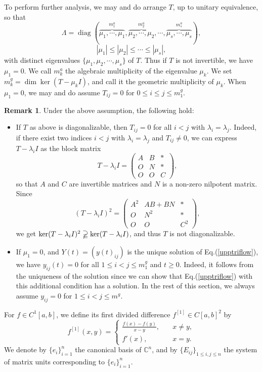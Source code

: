 \documentclass[12pt]{article}
\theoremstyle{definition}
\newtheorem{remark}[theorem]{Remark}
\numberwithin{equation}{section}
\newcommand{\C}{\mathbb{C}}
\DeclareMathOperator{\diag}{diag}
\begin{document}
To perform further analysis, we may and do arrange $T$, up to unitary equivalence, so that 
\[\Lambda=\diag(\overbrace{\mu_1,\cdots,\mu_1}^{m^a_1},\overbrace{\mu_2,\cdots,\mu_2}^{m^a_2},\cdots, 
\overbrace{\mu_s,\cdots,\mu_s}^{m^a_s}),\]
\[|\mu_1|\leq |\mu_2|\leq \cdots\leq |\mu_s|,\]
with distinct eigenvalues $\{\mu_1,\mu_2,\cdots,\mu_s\}$ of $T$. 
Thus if $T$ is not invertible, we have $\mu_1=0$. 
We call $m^a_k$ the algebraic multiplicity of the eigenvalue $\mu_k$. 
We set $m^g_k=\dim \ker(T-\mu_k I)$, and call it the geometric multiplicity of $\mu_k$. 
When $\mu_1=0$, we may and do assume $T_{ij}=0$ for $0\leq i\leq j\leq m^g_1$. 

\begin{remark}\label{diagonalizable} 
Under the above assumption, the following hold: 
\begin{itemize}
\item[(1)] If $T$ as above is diagonalizable, then $T_{ij}=0$ for all $i<j$ with $\lambda_i=\lambda_j$.   
	Indeed, if there exist two indices $i<j$ with $\lambda_i=\lambda_j$ and $T_{ij}\neq 0$, 
	we can express $T-\lambda_iI$ as the block matrix 
	\[T-\lambda_iI=\left(
	\begin{array}{ccc}
		A &B &*  \\
		O &N &*  \\
		O &O &C 
	\end{array}
	\right),
	\]
	so that $A$ and $C$ are invertible matrices and $N$ is a non-zero nilpotent matrix. 
	Since \[(T-\lambda_iI)^2=\left(
	\begin{array}{ccc}
		A^2 &AB+ BN&*  \\
		O &N^2 &*  \\
		O &O &C^2 
	\end{array}
	\right),
	\]
	we get $\ker (T-\lambda_i I)^2\varsupsetneqq\ker (T-\lambda_i I)$, and thus $T$ is not diagonalizable. 
\item[(2)] If $\mu_1=0$, and $Y(t)=(y(t)_{ij})$ is the unique solution of Eq.(\ref{upptriflow}), 
we have $y_{ij}(t)=0$ for all $1\leq i<j\leq m^g_1$ and $t\geq 0$. 
Indeed, it follows from the uniqueness of the solution since we can show that Eq.(\ref{upptriflow}) with 
this additional condition has a solution. 
In the rest of this section, we always assume $y_{ij}=0$ for $1\leq i<j\leq m^g$. 
\end{itemize}
\end{remark}	

For $f\in C^1[a,b]$, we define its first divided difference $f^{[1]}\in C[a,b]^2$ by 
\[f^{[1]}(x,y)=\left\{
\begin{array}{ll}
\frac{f(x)-f(y)}{x-y} , &\quad x\neq y,  \\
f'(x) , &\quad x=y. 
\end{array}
\right.
\]
We denote by $\{e_i\}_{i=1}^n$ the canonical basis of $\C^n$, and by $\{E_{ij}\}_{1\leq i,j\leq n}$ 
the system of matrix units corresponding to $\{e_i\}_{i=1}^n$.  
\end{document}
